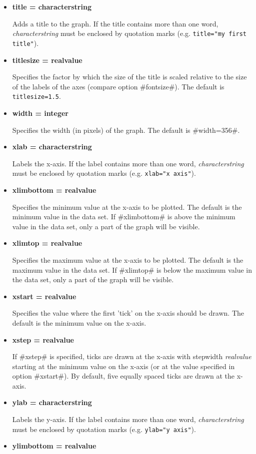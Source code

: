 \begin{itemize}
\item {\bf title = characterstring}

Adds a title to the graph. If the title contains more than one word,
{\em characterstring} must be enclosed by quotation marks (e.g.
\texttt{title="my first title"}).
\item {\bf titlesize = realvalue}

Specifies the factor by which the size of the title is scaled
relative to the size of the labels of the axes (compare option
#fontsize#). The default is \texttt{titlesize=1.5}.

\item {\bf width = integer}

Specifies the width (in pixels) of the graph. The default is
#width=356#.
\item {\bf xlab = characterstring}

Labels the x-axis. If the label contains more than one word, {\em
characterstring} must be enclosed by quotation marks (e.g.
\texttt{xlab="x axis"}).
\item {\bf xlimbottom = realvalue}

Specifies the minimum value at the x-axis to be plotted. The default
is the minimum value in the data set. If #xlimbottom# is above the
minimum value in the data set, only a part of the graph will be
visible.
\item {\bf xlimtop = realvalue}

Specifies the maximum value at the x-axis to be plotted. The default
is the maximum value in the data set. If #xlimtop# is below the
maximum value in the data set, only a part of the graph will be
visible.
\item {\bf xstart = realvalue}

Specifies the value where the first 'tick' on the x-axis should be
drawn. The default is the minimum value on the x-axis.
\item {\bf xstep = realvalue}

If #xstep# is specified,  ticks are drawn at the x-axis with
stepwidth {\em realvalue} starting at the minimum value on the
x-axis (or at the value specified in option #xstart#). By default,
five equally spaced ticks are drawn at the x-axis.
\item {\bf ylab = characterstring}

Labels the y-axis. If the label contains more than one word, {\em
characterstring} must be enclosed by quotation marks (e.g.
\texttt{ylab="y axis"}).
\item {\bf ylimbottom = realvalue}


\end{itemize}
